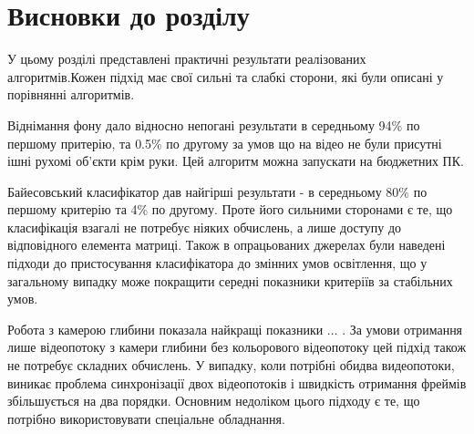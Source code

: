\section{Висновки до розділу}

У цьому розділі представлені практичні результати реалізованих алгоритмів.Кожен підхід має свої сильні та слабкі сторони, які були описані у порівнянні алгоритмів.

Віднімання фону дало відносно непогані результати в середньому 94\% по першому притерію, та 0.5\% по другому за умов що на відео не були присутні ішні рухомі об'єкти крім руки. Цей алгоритм можна запускати на бюджетних ПК.

Байесовський класифікатор дав найгірші результати - в середньому 80\% по першому критерію та 4\% по другому. Проте його сильними сторонами є те, що класифікація взагалі не потребує ніяких обчислень, а лише доступу до відповідного елемента матриці. Також в опрацьованих джерелах були наведені підходи до пристосування класифікатора до змінних умов освітлення, що у загальному випадку може покращити середні показники критеріїв за стабільних умов.

Робота з камерою глибини показала найкращі показники ... . За умови отримання лише відеопотоку з камери глибини без кольорового відеопотоку цей підхід також не потребує складних обчислень. У випадку, коли потрібні обидва видеопотоки, виникає проблема синхронізації двох відеопотоків і швидкість отримання фреймів збільшується на два порядки. Основним недоліком цього підходу є те, що потрібно використовувати спеціальне обладнання.